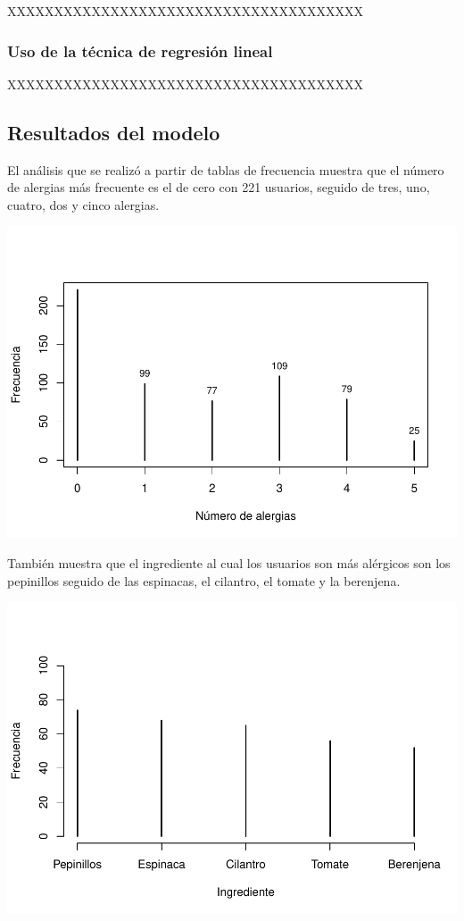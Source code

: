 \documentclass[
]{article}
\begin{document}
XXXXXXXXXXXXXXXXXXXXXXXXXXXXXXXXXXXXXX

\hypertarget{uso-de-la-tuxe9cnica-de-regresiuxf3n-lineal}{%
\subsubsection{Uso de la técnica de regresión
lineal}\label{uso-de-la-tuxe9cnica-de-regresiuxf3n-lineal}}

XXXXXXXXXXXXXXXXXXXXXXXXXXXXXXXXXXXXXX

\hypertarget{resultados-del-modelo}{%
\subsection{Resultados del modelo}\label{resultados-del-modelo}}

El análisis que se realizó a partir de tablas de frecuencia muestra que
el número de alergias más frecuente es el de cero con 221 usuarios,
seguido de tres, uno, cuatro, dos y cinco alergias.

\includegraphics{reporte_files/figure-latex/unnamed-chunk-5-1.pdf}

También muestra que el ingrediente al cual los usuarios son más
alérgicos son los pepinillos seguido de las espinacas, el cilantro, el
tomate y la berenjena.

\includegraphics{reporte_files/figure-latex/unnamed-chunk-6-1.pdf}
\end{document}
